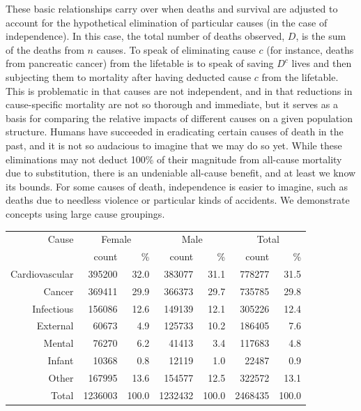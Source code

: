 \documentclass{article}
\begin{document}
These basic relationships carry over when deaths and survival are adjusted to
account for the hypothetical elimination of particular causes (in the case of
independence). In this case, the total number of deaths observed, $D$, is the
sum of the deaths from $n$ causes. To speak of eliminating cause $c$ (for
instance, deaths from pancreatic cancer) from the lifetable is to speak of
saving $D^{c}$ lives and then subjecting them to mortality after
having deducted cause $c$ from the lifetable.
This is problematic in that causes are not independent, and in that
reductions in cause-specific mortality are not so thorough and immediate, but it
serves as a basis for comparing the relative impacts of different causes on
a given population structure. Humans have succeeded in eradicating certain
causes of death in the past, and it
is not so audacious to imagine that we may do so yet. While these
eliminations may not deduct 100\% of their magnitude from all-cause mortality
due to substitution, there is an undeniable all-cause benefit, and at least 
we know its bounds. For some causes of death, independence is easier to imagine,
such as deaths due to needless violence or particular kinds of accidents. We
demonstrate concepts using large cause groupings.

\vspace{2em}
\begin{minipage}{\linewidth}
\centering
{}
\label{tab:counts}
\begin{tabular}{rrrrrrr}
\hline
Cause &\multicolumn{2}{c}{ Female }&\multicolumn{2}{c}{ Male
}&\multicolumn{2}{c}{ Total}
\\
 & count & \% & count & \% & count & \% \\ 
  \hline
   Cardiovascular & 395200 & 32.0 & 383077 & 31.1 & 778277 & 31.5 \\ 
Cancer & 369411 & 29.9 & 366373 & 29.7 & 735785 & 29.8 \\ 
  Infectious & 156086 & 12.6 & 149139 & 12.1 & 305226 & 12.4 \\ 
  External & 60673 & 4.9 & 125733 & 10.2 & 186405 & 7.6 \\ 
    Mental & 76270 & 6.2 & 41413 & 3.4 & 117683 & 4.8 \\ 
  Infant & 10368 & 0.8 & 12119 & 1.0 & 22487 & 0.9 \\ 
  Other & 167995 & 13.6 & 154577 & 12.5 & 322572 & 13.1 \\ 
  \hline
  Total & 1236003 & 100.0 & 1232432 & 100.0 & 2468435 & 100.0 \\
   \hline
\end{tabular}
\end{minipage}
\vspace{2em}
\end{document}
